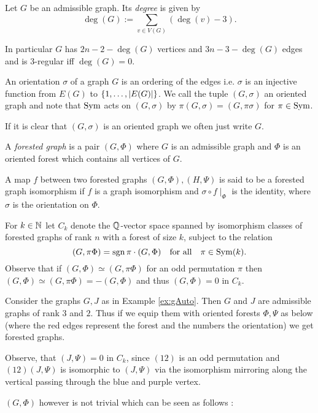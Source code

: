 \begin{definition}
	Let $G$ be an admissible graph. Its \emph{degree} is given by
	\[
		\deg(G) := \sum_{v \in V(G)} (\deg(v) - 3)
	.\] 
\end{definition}

In particular $G$ has $2n -2 - \deg(G)$ vertices and $3n -3 - \deg(G)$ edges and is $3$-regular iff $\deg(G) = 0$.

\begin{definition}
	An orientation $\sigma$ of a graph $G$ is an ordering of the edges i.e. $\sigma$ is an injective function from $E(G)$ to $\{1,\ldots,\abs{E(G)}\}$.
	We call the tuple $(G,\sigma)$ an oriented graph and note that $\operatorname{Sym}$ acts on $(G,\sigma)$ by $\pi (G,\sigma) = (G,\pi \sigma)$ for $\pi \in \operatorname{Sym}$.
\end{definition}

If it is clear that $(G,\sigma)$ is an oriented graph we often just write $G$.

\begin{definition}
	A \emph{forested graph} is a pair $(G,\Phi)$ where $G$ is an admissible graph and $\Phi$ is an oriented forest which contains all vertices of $G$.

	A map $f$ between two forested graphs $(G,\Phi), (H,\Psi)$ is said to be a forested graph isomorphism if $f$ is a graph isomorphism and $\sigma \circ f \mid_{\Phi} $  is
	the identity, where $\sigma$ is the orientation on $\Phi$.
\end{definition}

For $k \in \mathbb{N}$ let $C_{k}$ denote the $\mathbb{Q}$-vector space spanned by isomorphism classes of forested graphs of rank $n$ with a forest of size $k$, subject to the relation
\[
	(G,\pi \Phi) = \sgn{\pi} \cdot (G,\Phi) \qq{for all} \pi \in \on{Sym}(k)
.\] 
Observe that if $(G,\Phi) \simeq (G,\pi \Phi)$ for an odd permutation $\pi$ then $(G,\Phi) \simeq (G,\pi \Phi) = - (G,\Phi)$ and thus $(G,\Phi) = 0$ in  $C_{k}$.

\begin{eg}
	Consider the graphs $G, J$ as in Example \ref{ex:gAuto}. Then $G$ and $J$ are admissible graphs of rank $3$ and $2$. Thus if we equip them with oriented forests $\Phi, \Psi$ as below 
	(where the red edges represent the forest and the numbers the orientation) we get forested graphs.


	Observe, that $(J,\Psi) = 0$ in $C_{k}$, since $ (1 2)$ is an odd permutation and  $(1 2) (J,\Psi)$ is isomorphic to $(J,\Psi)$ 
	via the isomorphism mirroring along the vertical passing through the blue and purple vertex.

	$(G,\Phi)$ however is not trivial which can be seen as follows : 
\end{eg}

